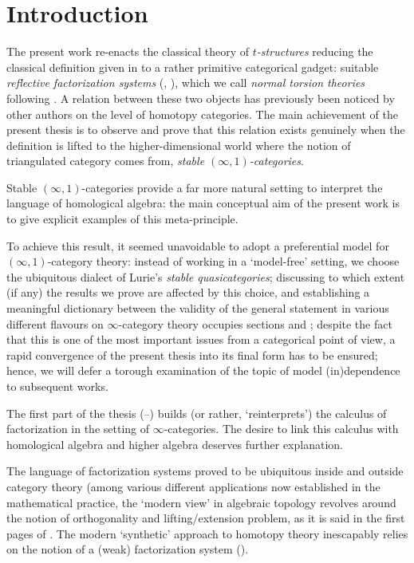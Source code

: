 \chapter{Introduction}
\thispagestyle{empty}
The present work re\hyp{}enacts the classical theory of \emph{$t$\hyp{}structures} reducing the classical definition given in \cite{BBDPervers,Kashiwara} to a rather primitive categorical gadget: suitable \emph{reflective factorization systems} (\adef {}, ), which we call \emph{normal torsion theories} following \cite{CHK,RT}. A  relation between these two objects has previously been noticed by other authors \cite{RT,HPS,Beligiannisreiten} on the level of homotopy categories. The main achievement of the present thesis is to observe and prove that this relation exists genuinely when the definition is lifted to the higher\hyp{}dimensional world where the notion of triangulated category comes from, \ie \emph{stable $(\infty,1)$\hyp{}categories}. 

Stable $(\infty,1)$\hyp{}categories provide a far more natural setting to interpret the language of homological algebra: the main conceptual aim of the present work is to give explicit examples of this meta\hyp{}principle.

To achieve this result, it seemed unavoidable to adopt a preferential model for $(\infty,1)$\hyp{}category theory: instead of working in a `model\hyp{}free' setting, we choose the ubiquitous dialect of Lurie's \emph{stable quasicategories}; discussing to which extent (if any) the results we prove are affected by this choice, and establishing a meaningful dictionary between the validity of the general statement  in various different flavours on $\infty$\hyp{}category theory occupies sections  and ; despite the fact that this is one of the most important issues from a categorical point of view, a rapid convergence of the present thesis into its final form has to be ensured; hence, we will defer a torough examination of the topic of model (in)dependence to subsequent works.

The first part of the thesis (\achap {}--) builds (or rather, `reinterprets') the calculus of factorization in the setting of $\infty$\hyp{}categories. The desire to link this calculus with homological algebra and higher algebra deserves further explanation. 

The language of factorization systems proved to be ubiquitous inside and outside category theory (among various different applications now established in the mathematical practice, the `modern view' in algebraic topology revolves around the notion of orthogonality and lifting\fshyp{}extension problem, as it is said in the first pages of \cite{whitehead61elements}. The modern `synthetic' approach to homotopy theory inescapably relies on the notion of a (weak) factorization system (\cite{Qui,Dwyer1995,riehl2011algebraic}).

